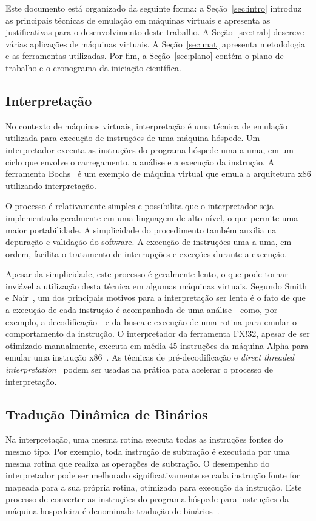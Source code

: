 \documentclass[a4paper,12pt]{article}
\begin{document}
Este documento está organizado da seguinte forma: a Seção~\ref{sec:intro}
introduz as principais técnicas de emulação em máquinas virtuais e apresenta as
justificativas para o desenvolvimento deste trabalho.  A Seção~\ref{sec:trab}
descreve várias aplicações de máquinas virtuais.  A Seção~\ref{sec:mat}
apresenta metodologia e as ferramentas utilizadas.
Por fim, a Seção~\ref{sec:plano} contém o plano de trabalho e o cronograma da
iniciação científica. %

\subsection{Interpretação}
\label{subsec:int}
No contexto de máquinas virtuais, interpretação é uma técnica de emulação
utilizada para execução de instruções de uma máquina hóspede. Um interpretador
executa as instruções do programa hóspede uma a uma, em um ciclo que envolve o
carregamento, a análise e a execução da instrução. A ferramenta
Bochs~\cite{boch} é um exemplo de máquina virtual que emula a arquitetura x86
utilizando interpretação.

O processo é relativamente simples e possibilita que o interpretador seja
implementado geralmente em uma linguagem de alto nível, o que permite uma maior
portabilidade. A simplicidade do procedimento também auxilia na depuração e
validação do software. A execução de instruções uma a uma, em ordem, facilita o
tratamento de interrupções e exceções durante a execução.%

Apesar da simplicidade, este processo é geralmente lento, o que pode tornar
inviável a utilização desta técnica em algumas máquinas virtuais. Segundo Smith
e Nair~\cite{smith_nair_1}, um dos principais motivos para a interpretação ser
lenta é o fato de que a execução de cada instrução é acompanhada de uma análise
- como, por exemplo, a decodificação - e da busca e execução de uma rotina para
emular o comportamento da instrução. O interpretador da ferramenta FX!32, apesar
de ser otimizado manualmente, executa em média 45 instruções da máquina Alpha
para emular uma instrução x86~\cite{fx32}. As técnicas de pré-decodificação e
\emph{direct threaded interpretation}~\cite{opt_branch, klint} podem ser usadas
na prática para acelerar o processo de interpretação.

\subsection{Tradução Dinâmica de Binários}
\label{subsec:trad}
Na interpretação, uma mesma rotina executa todas as instruções fontes do mesmo
tipo. Por exemplo, toda instrução de subtração é executada por uma mesma rotina
que realiza as operações de subtração. O desempenho do interpretador pode ser
melhorado significativamente se cada instrução fonte for mapeada para a sua
própria rotina, otimizada para execução da instrução. Este processo de converter
as instruções do programa hóspede para instruções da máquina hospedeira é
denominado tradução de binários~\cite{bin_t}.
\end{document}
